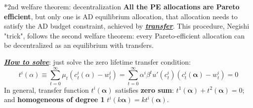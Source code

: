 \documentclass[10pt,landscape,a4paper]{article}
\makeatletter
\renewcommand{\subsubsection}{\@startsection{subsubsection}{1}{0mm}{.2ex}{.2ex}{\bfseries}}
\makeatother
\begin{document}
\begin{multicols*}{3}
\subsubsection*{2nd welfare theorem: decentralization}
\textbf{All the PE allocations are Pareto efficient}, but only one is AD equilibrium allocation, that allocation needs to satisfy the AD budget constraint, achieved by \underline{\textit{\textbf{transfer}}}. This procedure, Negishi "trick", follows the second welfare theorem: every Pareto-efficient allocation can be decentralized as an equilibrium with transfers.

\vspace{2pt}


\underline{\textbf{\textit{How to solve}}}: just solve the zero lifetime transfer condition:
$$t^i(\alpha)\equiv \sum^{\infty}_{t=0}\mu_t\left(c^i_t(\alpha)-w_t^i\right) =\sum^{\infty}_{t=0}\alpha^i\beta^t u'(c_t^i)\left(c^i_t(\mathbf{\alpha})-w_t^i\right)=0$$
In general, transfer function $t^i(\mathbf{\alpha})$ satisfies \textbf{zero sum}: $t^1(\mathbf{\alpha})+t^2(\mathbf{\alpha})=0$; and \textbf{homogeneous of degree 1} $t^i(k\mathbf{\alpha})=kt^i(\mathbf{\alpha})$.



\end{multicols*}
\end{document}
